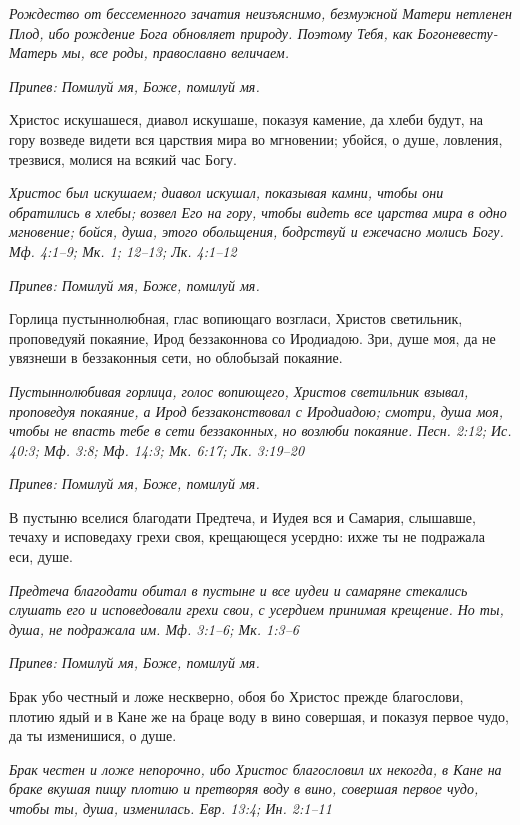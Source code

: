 \itshape Рождество от бессеменного зачатия неизъяснимо, безмужной Матери нетленен Плод, ибо рождение Бога обновляет природу. Поэтому Тебя, как Богоневесту-Матерь мы, все роды, православно величаем.\normalfont{}


\itshape Припев:\normalfont{} Помилуй мя, Боже, помилуй мя.


Христос искушашеся, диавол искушаше, показуя камение, да хлеби будут, на гору возведе видети вся царствия мира во мгновении; убойся, о душе, ловления, трезвися, молися на всякий час Богу.


\itshape Христос был искушаем; диавол искушал, показывая камни, чтобы они обратились в хлебы; возвел Его на гору, чтобы видеть все царства мира в одно мгновение; бойся, душа, этого обольщения, бодрствуй и ежечасно молись Богу. Мф. 4:1–9; Мк. 1; 12–13; Лк. 4:1–12\normalfont{}


\itshape Припев:\normalfont{} Помилуй мя, Боже, помилуй мя.


Горлица пустыннолюбная, глас вопиющаго возгласи, Христов светильник, проповедуяй покаяние, Ирод беззаконнова со Иродиадою. Зри, душе моя, да не увязнеши в беззаконныя сети, но облобызай покаяние.


\itshape Пустыннолюбивая горлица, голос вопиющего, Христов светильник взывал, проповедуя покаяние, а Ирод беззаконствовал с Иродиадою; смотри, душа моя, чтобы не впасть тебе в сети беззаконных, но возлюби покаяние. Песн. 2:12; Ис. 40:3; Мф. 3:8; Мф. 14:3; Мк. 6:17; Лк. 3:19–20\normalfont{}


\itshape Припев:\normalfont{} Помилуй мя, Боже, помилуй мя.


В пустыню вселися благодати Предтеча, и Иудея вся и Самария, слышавше, течаху и исповедаху грехи своя, крещающеся усердно: ихже ты не подражала еси, душе.


\itshape Предтеча благодати обитал в пустыне и все иудеи и самаряне стекались слушать его и исповедовали грехи свои, с усердием принимая крещение. Но ты, душа, не подражала им. Мф. 3:1–6; Мк. 1:3–6\normalfont{}


\itshape Припев:\normalfont{} Помилуй мя, Боже, помилуй мя.


Брак убо честный и ложе нескверно, обоя бо Христос прежде благослови, плотию ядый и в Кане же на браце воду в вино совершая, и показуя первое чудо, да ты изменишися, о душе.


\itshape Брак честен и ложе непорочно, ибо Христос благословил их некогда, в Кане на браке вкушая пищу плотию и претворяя воду в вино, совершая первое чудо, чтобы ты, душа, изменилась. Евр. 13:4; Ин. 2:1–11\normalfont{}


